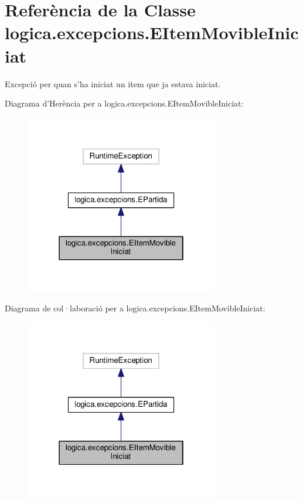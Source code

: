 \hypertarget{classlogica_1_1excepcions_1_1_e_item_movible_iniciat}{\section{Referència de la Classe logica.\+excepcions.\+E\+Item\+Movible\+Iniciat}
\label{classlogica_1_1excepcions_1_1_e_item_movible_iniciat}
}


Excepció per quan s'ha iniciat un item que ja estava iniciat.  




Diagrama d'Herència per a logica.\+excepcions.\+E\+Item\+Movible\+Iniciat\+:
\nopagebreak
\begin{figure}[H]
\begin{center}
\leavevmode
\includegraphics[width=238pt]{classlogica_1_1excepcions_1_1_e_item_movible_iniciat__inherit__graph}
\end{center}
\end{figure}


Diagrama de col·laboració per a logica.\+excepcions.\+E\+Item\+Movible\+Iniciat\+:
\nopagebreak
\begin{figure}[H]
\begin{center}
\leavevmode
\includegraphics[width=238pt]{classlogica_1_1excepcions_1_1_e_item_movible_iniciat__coll__graph}
\end{center}
\end{figure}
